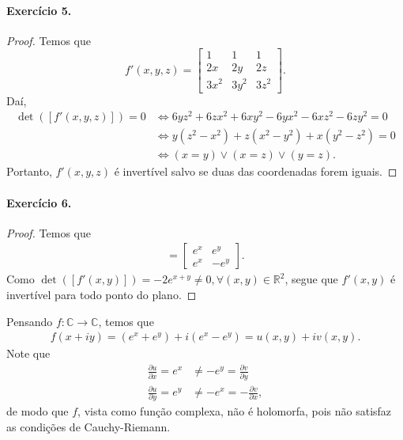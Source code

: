 \documentclass[12pt,a4paper]{article}
\newcommand{\C}{\mathbb{C}}
\newcommand{\R}{\mathbb{R}}
\begin{document}
\paragraph{Exercício 5.}
    \begin{proof}
        Temos que
        \begin{equation*}
            f'(x,y,z) =
            \begin{bmatrix}
                1 & 1 & 1 \\
                2x & 2y & 2z \\
                3x^2 & 3y^2 & 3z^2
            \end{bmatrix}.
        \end{equation*}
        Daí,
        \begin{align*}
            \det([f'(x,y,z)]) = 0 &\iff 6yz^2 + 6zx^2 + 6xy^2 - 6yx^2 - 6xz^2 - 6zy^2 = 0 \\
                                  &\iff y(z^2 - x^2) + z(x^2 - y^2) + x(y^2 - z^2) = 0 \\
                                  &\iff (x = y) \lor (x = z) \lor (y = z).
        \end{align*}
        Portanto, $f'(x,y,z)$ é invertível salvo se duas das coordenadas forem iguais.
    \end{proof}
\paragraph{Exercício 6.}
    \begin{proof}
        Temos que
        \begin{align*}
            [f'(x,y)] =
            \begin{bmatrix}
                e^x & e^y \\
                e^x & -e^y
            \end{bmatrix}.
        \end{align*}
        Como $\det([f'(x,y)]) = -2e^{x+y} \neq 0, \forall (x,y)\in\R^2$, segue que $f'(x,y)$ é invertível
        para todo ponto do plano.
    \end{proof}
    Pensando $f:\C\to\C$, temos que
    \begin{align*}
        f(x+iy) = (e^x + e^y) + i(e^x - e^y) = u(x,y) + iv(x,y).   
    \end{align*}
    Note que
    \begin{align*}
        \frac{\partial u}{\partial x} = e^x &\neq -e^y = \frac{\partial v}{\partial y} \\
        \frac{\partial u}{\partial y} = e^y &\neq -e^x = -\frac{\partial v}{\partial x},
    \end{align*}
    de modo que $f$, vista como função complexa, não é holomorfa, pois não satisfaz as condições de 
    Cauchy-Riemann.
\end{document}
